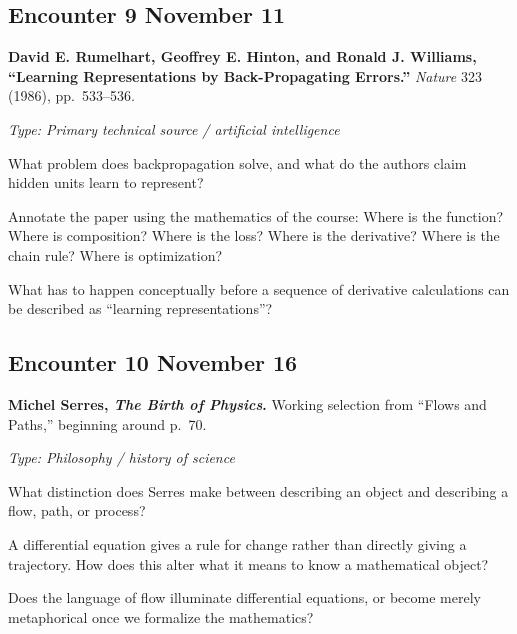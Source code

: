 \subsection*{Encounter 9 \hfill November 11}

\textbf{David E. Rumelhart, Geoffrey E. Hinton, and Ronald J. Williams,
``Learning Representations by Back-Propagating Errors.''}
\emph{Nature} 323 (1986), pp.~533--536.

\textit{Type: Primary technical source / artificial intelligence}

\begin{description}[leftmargin=1.15in,style=nextline]
\item[\textcolor{LangRed}{READ}]
What problem does backpropagation solve, and what do the authors claim hidden
units learn to represent?
\item[\textcolor{LangRed}{CONNECT}]
Annotate the paper using the mathematics of the course: Where is the function?
Where is composition? Where is the loss? Where is the derivative? Where is the
chain rule? Where is optimization?
\item[\textcolor{LangRed}{QUESTION}]
What has to happen conceptually before a sequence of derivative calculations
can be described as ``learning representations''?
\end{description}

\subsection*{Encounter 10 \hfill November 16}

\textbf{Michel Serres, \emph{The Birth of Physics}.}
Working selection from ``Flows and Paths,'' beginning around p.~70.

\textit{Type: Philosophy / history of science}

\begin{description}[leftmargin=1.15in,style=nextline]
\item[\textcolor{LangRed}{READ}]
What distinction does Serres make between describing an object and describing
a flow, path, or process?
\item[\textcolor{LangRed}{CONNECT}]
A differential equation gives a rule for change rather than directly giving a
trajectory. How does this alter what it means to know a mathematical object?
\item[\textcolor{LangRed}{QUESTION}]
Does the language of flow illuminate differential equations, or become merely
metaphorical once we formalize the mathematics?
\end{description}

